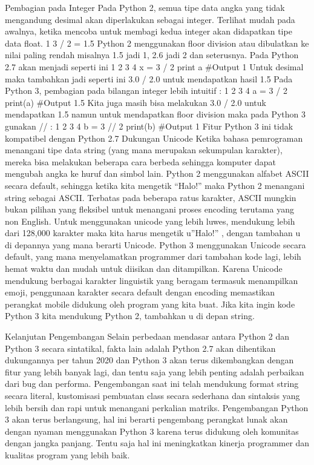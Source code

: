 Pembagian pada Integer
Pada Python 2, semua tipe data angka yang tidak mengandung desimal akan diperlakukan sebagai integer. Terlihat mudah pada awalnya, ketika mencoba untuk membagi kedua integer akan didapatkan tipe data float.
1	3 / 2 = 1.5
Python 2 menggunakan floor division atau dibulatkan ke nilai paling rendah misalnya 1.5 jadi 1, 2.6 jadi 2 dan seterusnya. Pada Python 2.7 akan menjadi seperti ini
1
2
3
4	x = 3 / 2
print a
#Output
1
Untuk desimal maka tambahkan jadi seperti ini 3.0 / 2.0  untuk mendapatkan hasil 1.5
Pada Python 3, pembagian pada bilangan integer lebih intuitif :
1
2
3
4	a = 3 / 2
print(a)
#Output
1.5
Kita juga masih bisa melakukan 3.0 / 2.0  untuk mendapatkan 1.5 namun untuk mendapatkan floor division maka pada Python 3 gunakan //  :
1
2
3
4	b = 3 // 2
print(b)
#Output
1
Fitur Python 3 ini tidak kompatibel dengan Python 2.7
Dukungan Unicode
Ketika bahasa pemrograman menangani tipe data string (yang mana merupakan sekumpulan karakter), mereka bisa melakukan beberapa cara berbeda sehingga komputer dapat mengubah angka ke huruf dan simbol lain. Python 2 menggunakan alfabet ASCII secara default, sehingga ketika kita mengetik “Halo!”  maka Python 2 menangani string sebagai ASCII. Terbatas pada beberapa ratus karakter, ASCII mungkin bukan pilihan yang fleksibel untuk menangani proses encoding terutama yang non English.
Untuk menggunakan unicode yang lebih luwes, mendukung lebih dari 128,000 karakter maka kita harus mengetik u”Halo!” , dengan tambahan u  di depannya yang mana berarti Unicode.
Python 3 menggunakan Unicode secara default, yang mana menyelamatkan programmer dari tambahan kode lagi, lebih hemat waktu dan mudah untuk diisikan dan ditampilkan. Karena Unicode mendukung berbagai karakter linguistik yang beragam termasuk menampilkan emoji, penggunaan karakter secara default dengan encoding memastikan perangkat mobile didukung oleh program yang kita buat.
Jika kita ingin kode Python 3 kita mendukung Python 2, tambahkan u di depan string.
 
Kelanjutan Pengembangan
Selain perbedaan mendasar antara Python 2 dan Python 3 secara sintatikal, fakta lain adalah Python 2.7 akan dihentikan dukungannya per tahun 2020 dan Python 3 akan terus dikembangkan dengan fitur yang lebih banyak lagi, dan tentu saja yang lebih penting adalah perbaikan dari bug dan performa. Pengembangan saat ini telah mendukung format string secara literal, kustomisasi pembuatan class secara sederhana dan sintaksis yang lebih bersih dan rapi untuk menangani perkalian matriks.
Pengembangan Python 3 akan terus berlangsung, hal ini berarti pengembang perangkat lunak akan dengan nyaman menggunakan Python 3 karena terus didukung oleh komunitas dengan jangka panjang. Tentu saja hal ini meningkatkan kinerja programmer dan kualitas program yang lebih baik.
 
